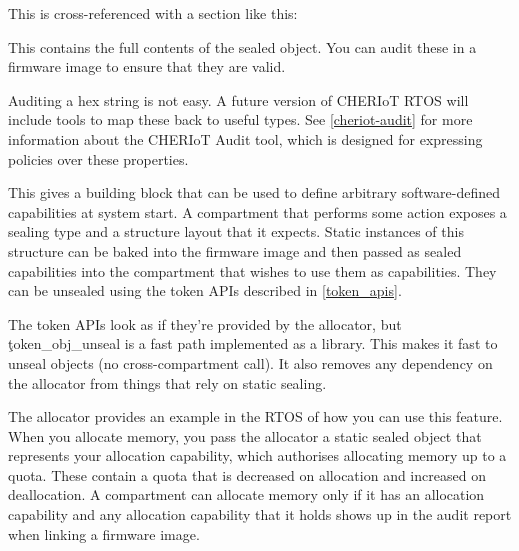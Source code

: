 This is cross-referenced with a section like this:

\begin{jsonsnippet}
{ 
  "contents": "00100000 00000000 00000000 00000000 00000000 00000000",
  "kind": "SealedObject",
  "sealing_type": {
    "compartment": "alloc",
    "key": "MallocKey",
    "provided_by": "build/cheriot/cheriot/release/cheriot.allocator.compartment",
    "symbol": "__export.sealing_type.alloc.MallocKey"
  \}
\},
\end{jsonsnippet}

This contains the full contents of the sealed object.
You can audit these in a firmware image to ensure that they are valid.

\begin{note}
Auditing a hex string is not easy.
A future version of CHERIoT RTOS will include tools to map these back to useful types.
See \ref{cheriot-audit} for more information about the CHERIoT Audit tool, which is designed for expressing policies over these properties.
\end{note}

This gives a building block that can be used to define arbitrary software-defined capabilities at system start.
A compartment that performs some action exposes a sealing type and a structure layout that it expects.
Static instances of this structure can be baked into the firmware image and then passed as sealed capabilities into the compartment that wishes to use them as capabilities.
They can be unsealed using the token APIs described in \ref{token_apis}.

The token APIs look as if they're provided by the allocator, but \c{token_obj_unseal} is a fast path implemented as a library.
This makes it fast to unseal objects (no cross-compartment call).
It also removes any dependency on the allocator from things that rely on static sealing.

The allocator provides an example in the RTOS of how you can use this feature.
When you allocate memory, you pass the allocator a static sealed object that represents your allocation capability, which authorises allocating memory up to a quota.
These contain a quota that is decreased on allocation and increased on deallocation.
A compartment can allocate memory only if it has an allocation capability and any allocation capability that it holds shows up in the audit report when linking a firmware image.

